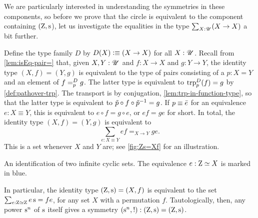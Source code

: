 We are particularly interested in understanding the symmetries in these components,
so before we prove that the circle is equivalent to the component containing $(\zet,\zs$),
let us investigate the equalities in the type $\sum_{X:{\mathscr{U}}}(X \to X)$ a bit further.

Define the type family $D$ by $D(X) \defeq (X\to X)$ for all $X:{\mathscr{U}}$.
Recall from \cref{lem:isEq-pair=} that, given $X,Y:{\mathscr{U}}$ and $f:X\to X$ and $g:Y\to Y$,
the identity type $(X,f)=(Y,g)$
is equivalent to the type of pairs consisting of a $p:X=Y$ and
an element of $\pathover{f}{D}{p}{g}$. The latter type is
equivalent to $\trp[D]{p}(f) = g$ by \cref{def:pathover-trp}.
The transport is by conjugation,
\cref{lem:trp-in-function-type}, so that the latter
type is equivalent to $\tilde {p}\circ f\circ \tilde {p}^{-1} = g$.
If $p\jdeq\etop e$ for an equivalence $e:X\equiv Y$,
this is equivalent to $e\circ f = g\circ e$, or $e f = g e$ for short.
In total, the identity type $(X,f)=(Y,g)$ is equivalent to
\[
  \sum_{e: X\equiv Y} ef =_{X\to Y} ge.
\]
This is a set whenever $X$ and $Y$ are; see \cref{fig:Zs=Xf} for an illustration.
\begin{marginfigure}
  \caption{An identification of two infinite cyclic sets.
    The equivalence $e : \mathrm{Z} \simeq X$ is marked in blue.}\label{fig:Zs=Xf}
\end{marginfigure}
In particular, the identity type $(\zet,\zs)=(X,f)$
is equivalent to the set $\sum_{e:\zet\equiv\zet}e\zs=fe$, for any set $X$ with a permutation $f$.
Tautologically, then, any power $\zs^n$ of $\zs$ itself gives a symmetry
$(\zs^n,!) : (\zet,\zs)=(\zet,\zs)$.

